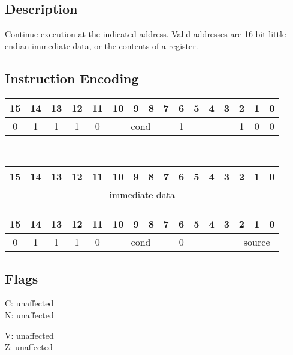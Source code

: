 \documentclass[11pt]{book}
\newcommand*{\encoding}[1]{\noindent
\begin{tabular}{|c|c|c|c|c|c|c|c|c|c|c|c|c|c|c|c|}
\multicolumn{1}{c}{15}&
\multicolumn{1}{c}{14}&
\multicolumn{1}{c}{13}&
\multicolumn{1}{c}{12}&
\multicolumn{1}{c}{11}&
\multicolumn{1}{c}{10}&
\multicolumn{1}{c}{9}&
\multicolumn{1}{c}{8}&
\multicolumn{1}{c}{7}&
\multicolumn{1}{c}{6}&
\multicolumn{1}{c}{5}&
\multicolumn{1}{c}{4}&
\multicolumn{1}{c}{3}&
\multicolumn{1}{c}{2}&
\multicolumn{1}{c}{1}&
\multicolumn{1}{c}{0}\\\hline
#1\\\hline
\end{tabular}}
\begin{document}
\subsection*{Description}
Continue execution at the indicated address.
Valid addresses are 16-bit little-endian immediate data,
or the contents of a register.

\subsection*{Instruction Encoding}
\encoding{0&1&1&1&0%
&\multicolumn{4}{|c|}{cond}%
&1&\multicolumn{3}{|c|}{--}&1&0&0}\\\null\qquad
\encoding{\multicolumn{16}{|c|}{immediate data}}

\vspace{2\baselineskip}
\encoding{0&1&1&1&0%
&\multicolumn{4}{|c|}{cond}%
&0&\multicolumn{3}{|c|}{--}&\multicolumn{3}{|c|}{source}}

\subsection*{Flags}
\begin{multicols}{2}\noindent
  C: unaffected\\
  N: unaffected

  \columnbreak\noindent
  V: unaffected\\
  Z: unaffected
\end{multicols}
\end{document}
